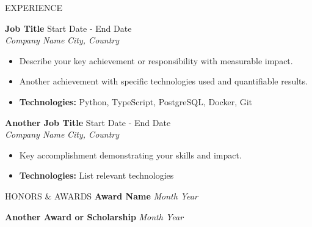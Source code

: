 \documentclass{resume}
\newenvironment{packeditemize}{
	\begin{list}{$\bullet$}{
			\setlength{\labelwidth}{4pt}
			\setlength{\itemsep}{0pt}
			\setlength{\leftmargin}{\labelwidth}
			\addtolength{\leftmargin}{\labelsep}
			\setlength{\parindent}{0pt}
			\setlength{\listparindent}{\parindent}
			\setlength{\parsep}{0pt}
			\setlength{\topsep}{1pt}}}{\end{list}}
\begin{document}
\begin{rSection}{EXPERIENCE}

{{\textbf{Job Title}} \hfill {Start Date - End Date}}\\
\vspace{-5pt}
{\textit{Company Name} \hfill {\em City, Country}}
\begin{itemize}[label=·]
    \item Describe your key achievement or responsibility with measurable impact.
    \vspace{-5pt}
    \item Another achievement with specific technologies used and quantifiable results.
    \vspace{-5pt}
    \item \textbf{Technologies:} Python, TypeScript, PostgreSQL, Docker, Git
\end{itemize}

{{\textbf{Another Job Title}} \hfill {Start Date - End Date}}\\
\vspace{-5pt}
{\textit{Company Name} \hfill {\em City, Country}}
\begin{itemize}[label=·]
    \item Key accomplishment demonstrating your skills and impact.
    \vspace{-5pt}
    \item \textbf{Technologies:} List relevant technologies
\end{itemize}

\end{rSection}


\begin{rSection}{HONORS \& AWARDS}
\textbf{Award Name} \hfill {\em Month Year}
\vspace{-5pt}

\textbf{Another Award or Scholarship} \hfill {\em Month Year}
\vspace{-5pt}

\end{rSection}
\end{document}
